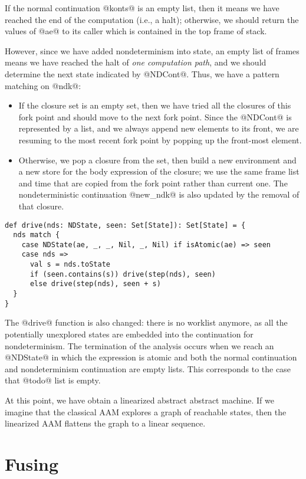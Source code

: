 \documentclass[acmsmall]{acmart}\settopmatter{}
\begin{document}
If the normal continuation @konts@ is an empty list, then it means we have reached
the end of the computation (i.e., a halt); otherwise, we should return the values of 
@ae@ to its caller which is contained in the top frame of stack.

However, since we have added nondeterminism into state, an empty list of frames means
we have reached the halt of \textit{one computation path}, and we should
determine the next state indicated by @NDCont@.
Thus, we have a pattern matching on @ndk@:
\begin{itemize}
  \item If the closure set is an empty set,
then we have tried all the closures of this fork point and should move to the
next fork point. Since the @NDCont@ is represented by a list, and we always
append new elements to its front, we are resuming to the most recent fork point by
popping up the front-most element.
  \item Otherwise, we pop a closure from the set, then build a new
environment and a new store for the body expression of the closure;
we use the same frame list and time that are copied from the fork point rather
than current one.
The nondeterministic continuation @new_ndk@ is also updated by the removal of that closure.
\end{itemize}

\begin{lstlisting}
def drive(nds: NDState, seen: Set[State]): Set[State] = {
  nds match {
    case NDState(ae, _, _, Nil, _, Nil) if isAtomic(ae) => seen
    case nds =>
      val s = nds.toState
      if (seen.contains(s)) drive(step(nds), seen)
      else drive(step(nds), seen + s)
  }
}
\end{lstlisting}

The @drive@ function is also changed: there is no worklist anymore, as all the
potentially unexplored states are embedded into the continuation for
nondeterminism.
The termination of the analysis occurs when we reach an @NDState@ in which the expression
is atomic and both the normal continuation and nondeterminism continuation are
empty lists. This corresponds to the case that @todo@ list is empty.

At this point, we have obtain a linearized abstract abstract machine. If we imagine that the
classical AAM explores a graph of reachable states, then the linearized AAM flattens the
graph to a linear sequence.

\section{Fusing} \label{fusing}
\end{document}
